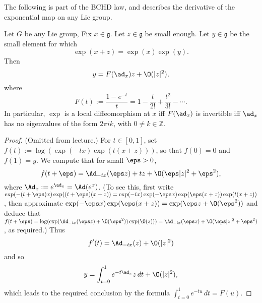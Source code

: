 \documentclass[reqno]{amsart} 
\begin{document}
The following is part of the BCHD law, and describes the derivative of the exponential map on any Lie group.
\begin{lemma}\label{lem:deriv-of-expo}
  Let $G$ be any Lie group, Fix $x \in \mathfrak{g}$.  Let $z \in \mathfrak{g}$ be small enough.  Let $y \in \mathfrak{g}$ be the small element for which
  \begin{equation*}
    \exp(x + z) = \exp(x) \exp(y).
  \end{equation*}
  Then
  \begin{equation*}
    y = F(\ad_x) z + \O(|z|^2),
  \end{equation*}
  where
  \begin{equation*}
    F(t) := \frac{1 - e^{-t }}{t}
    = 1 - \frac{t}{2!}
    + \frac{t^2}{3!} - \dotsb.
  \end{equation*}
  In particular, $\exp$ is a local diffeomorphism at $x$ iff $F(\ad_x)$ is invertible iff $\ad_x$ has no eigenvalues of the form $2 \pi i k$, with $0 \neq k \in \mathbb{Z}$.
\end{lemma}
\begin{proof}
  (Omitted from lecture.)  For $t \in [0,1]$, set $f(t) := \log (\exp(-t x) \exp(t (x+z)))$, so that $f(0) = 0$ and $f(1) = y$.  We compute that for small $\eps > 0$,
  \begin{equation*}
    f(t + \eps)
    = \Ad_{-t x} (\eps z) + t z + \O(\eps |z|^2 + \eps^2),
  \end{equation*}
  where $\Ad_x := e^{\ad_x} = \Ad(e^x)$.  (To see this, first write $\exp(-(t + \eps) x) \exp((t+\eps)(x+z)) = \exp(-t x) \exp(-\eps x) \exp(\eps(x+z)) \exp(t(x+z))$, then approximate $\exp(-\eps x) \exp(\eps(x+z)) = \exp(\eps z + \O(\eps^2))$ and deduce that $f(t+\eps) = \log(\exp(\Ad_{-t x}(\eps z) + \O(\eps^2)) \exp(\O(z))) = \Ad_{-t x}(\eps z) + \O(\eps |z|^2 + \eps^2)$, as required.)  Thus
  \begin{equation*}
    f'(t) = \Ad_{-t x}(z) + \O(|z|^2)
  \end{equation*}
  and so
  \begin{equation*}
    y = \int_{t = 0}^{1} e^{-t \ad_x} z \, d t + \O(|z|^2),
  \end{equation*}
  which leads to the required conclusion by the formula $\int_{t=0}^1 e^{-t u} \, d t = F(u)$.
\end{proof}
\end{document}
